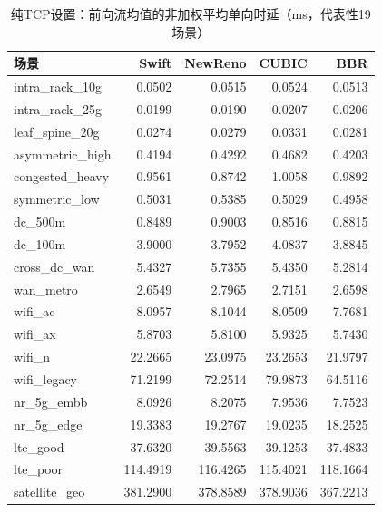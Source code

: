 \documentclass[10pt,twocolumn]{article}
\begin{document}
\begin{table}[htbp]
\centering
\caption{纯TCP设置：前向流均值的非加权平均单向时延（ms，代表性19场景）}
\label{tab:latency}
\scriptsize
\setlength{\tabcolsep}{3pt}
\begin{tabular}{@{}lrrrr@{}}
\toprule
\textbf{场景} & \textbf{Swift} & \textbf{NewReno} & \textbf{CUBIC} & \textbf{BBR} \\
\midrule
intra\_rack\_10g & 0.0502 & 0.0515 & 0.0524 & 0.0513 \\
intra\_rack\_25g & 0.0199 & 0.0190 & 0.0207 & 0.0206 \\
leaf\_spine\_20g & 0.0274 & 0.0279 & 0.0331 & 0.0281 \\
\midrule
asymmetric\_high & 0.4194 & 0.4292 & 0.4682 & 0.4203 \\
congested\_heavy & 0.9561 & 0.8742 & 1.0058 & 0.9892 \\
symmetric\_low & 0.5031 & 0.5385 & 0.5029 & 0.4958 \\
dc\_500m & 0.8489 & 0.9003 & 0.8516 & 0.8815 \\
dc\_100m & 3.9000 & 3.7952 & 4.0837 & 3.8845 \\
cross\_dc\_wan & 5.4327 & 5.7355 & 5.4350 & 5.2814 \\
wan\_metro & 2.6549 & 2.7965 & 2.7151 & 2.6598 \\
\midrule
wifi\_ac & 8.0957 & 8.1044 & 8.0509 & 7.7681 \\
wifi\_ax & 5.8703 & 5.8100 & 5.9325 & 5.7430 \\
wifi\_n & 22.2665 & 23.0975 & 23.2653 & 21.9797 \\
wifi\_legacy & 71.2199 & 72.2514 & 79.9873 & 64.5116 \\
nr\_5g\_embb & 8.0926 & 8.2075 & 7.9536 & 7.7523 \\
nr\_5g\_edge & 19.3383 & 19.2767 & 19.0235 & 18.2525 \\
lte\_good & 37.6320 & 39.5563 & 39.1253 & 37.4833 \\
lte\_poor & 114.4919 & 116.4265 & 115.4021 & 118.1664 \\
\midrule
satellite\_geo & 381.2900 & 378.8589 & 378.9036 & 367.2213 \\
\bottomrule
\end{tabular}
\end{table}
\end{document}
